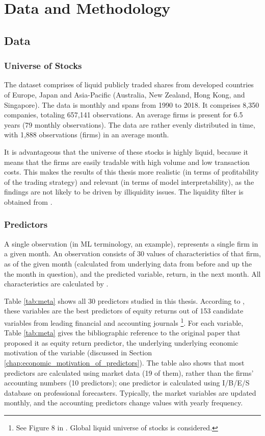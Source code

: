 \chapter{Data and Methodology}
\label{chap:met}

\section{Data}

	\subsection{Universe of Stocks}
		The dataset comprises of liquid publicly traded shares from developed countries of Europe, Japan and Asia-Pacific (Australia, New Zealand, Hong Kong, and Singapore). The data is monthly and spans from 1990 to 2018. It comprises 8,350 companies, totaling 657,141 observations. An average firms is present for 6.5 years (79 monthly observations). The data are rather evenly distributed in time, with 1,888 observations (firms) in an average month. 
		
		It is advantageous that the universe of these stocks is highly liquid, because it means that the firms are easily tradable with high volume and low transaction costs. This makes the results of this thesis more realistic (in terms of profitability of the trading strategy) and relevant (in terms of model interpretability), as the findings are not likely to be driven by illiquidity issues. The liquidity filter is obtained from \cite{tobek2020does}.  
	
	\subsection{Predictors}
	
		A single observation (in ML terminology, an example), represents a single firm in a given month. An observation consists of 30 values of characteristics of that firm, as of the given month (calculated from underlying data from before and up the the month in question), and the predicted variable, return, in the next month. All characteristics are calculated by \cite{tobek2020does}.   
		
		Table \ref{tab:meta} shows all 30 predictors studied in this thesis. According to \cite{tobek2020does}, these variables are the best predictors of equity returns out of 153  candidate variables from leading financial and accounting journals \footnote{See Figure 8 in \cite{tobek2020does}. Global liquid universe of stocks is considered.}. For each variable, Table \ref{tab:meta} gives the bibliographic reference to the original paper that proposed it as equity return predictor, the underlying underlying economic motivation of the variable (discussed in Section \ref{chap:economic_motivation_of_predictors}). The table also shows that most predictors are calculated using market data (19 of them), rather than the firms' accounting numbers (10 predictors); one predictor is calculated using I/B/E/S database on professional forecasters. Typically, the market variables are updated monthly, and the accounting predictors change values with yearly frequency.
		
